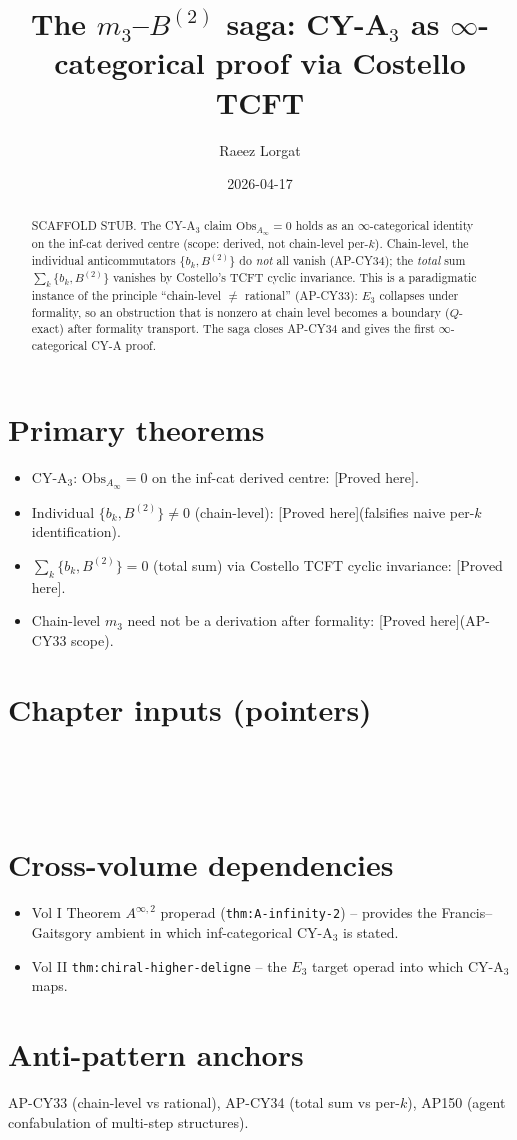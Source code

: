 \documentclass[11pt]{amsart}
\title[$m_3$ / $B^{(2)}$ saga]{The $m_3$--$B^{(2)}$ saga:
CY-A$_3$ as $\infty$-categorical proof via Costello TCFT}
\author{Raeez Lorgat}
\date{2026-04-17}
\providecommand{\ClaimStatusProvedHere}{\textsf{[Proved here]}}
\theoremstyle{definition}
\theoremstyle{remark}
\begin{document}
\maketitle

\begin{abstract}
SCAFFOLD STUB. The CY-A$_3$ claim $\mathrm{Obs}_{A_\infty} = 0$ holds
as an $\infty$-categorical identity on the inf-cat derived centre (scope:
derived, not chain-level per-$k$). Chain-level, the individual
anticommutators $\{b_k, B^{(2)}\}$ do \emph{not} all vanish (AP-CY34); the
\emph{total} sum $\sum_k \{b_k, B^{(2)}\}$ vanishes by Costello's TCFT
cyclic invariance. This is a paradigmatic instance of the principle
``chain-level $\ne$ rational'' (AP-CY33): $E_3$ collapses under formality,
so an obstruction that is nonzero at chain level becomes a boundary
($Q$-exact) after formality transport. The saga closes AP-CY34 and gives
the first $\infty$-categorical CY-A proof.
\end{abstract}

\section*{Primary theorems}
\begin{itemize}
\item CY-A$_3$: $\mathrm{Obs}_{A_\infty} = 0$ on the inf-cat derived centre:
  \ClaimStatusProvedHere.
\item Individual $\{b_k, B^{(2)}\} \ne 0$ (chain-level):
  \ClaimStatusProvedHere (falsifies naive per-$k$ identification).
\item $\sum_k \{b_k, B^{(2)}\} = 0$ (total sum) via Costello TCFT
  cyclic invariance: \ClaimStatusProvedHere.
\item Chain-level $m_3$ need not be a derivation after formality:
  \ClaimStatusProvedHere (AP-CY33 scope).
\end{itemize}

\section*{Chapter inputs (pointers)}
\begin{verbatim}




\end{verbatim}

\section*{Cross-volume dependencies}
\begin{itemize}
\item Vol I Theorem $A^{\infty,2}$ properad (\texttt{thm:A-infinity-2}) --
  provides the Francis--Gaitsgory ambient in which inf-categorical CY-A$_3$
  is stated.
\item Vol II \texttt{thm:chiral-higher-deligne} -- the $E_3$ target operad
  into which CY-A$_3$ maps.
\end{itemize}

\section*{Anti-pattern anchors}
AP-CY33 (chain-level vs rational), AP-CY34 (total sum vs per-$k$),
AP150 (agent confabulation of multi-step structures).



\end{document}
